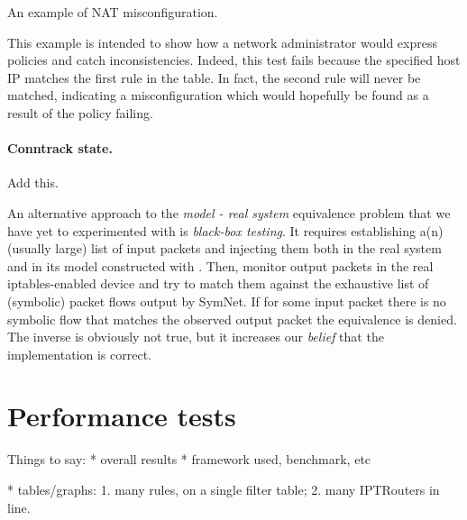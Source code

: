 \begin{listing}[H]
  \caption{An example of NAT misconfiguration.}
  \label{lst:unreachable-rule}
\end{listing}

This example is intended to show how a network administrator would express
policies and catch inconsistencies.  Indeed, this test fails because the
specified host IP matches the first rule in the table.  In fact, the second
rule will never be matched, indicating a misconfiguration which would hopefully
be found as a result of the policy failing.

\paragraph{Conntrack state.}
Add this.

\bigskip

An alternative approach to the \emph{model - real system} equivalence problem
that we have yet to experimented with is \emph{black-box testing}.  It requires
establishing a(n) (usually large) list of input packets and injecting them both
in the real system and in its model constructed with \TOOL.  Then, monitor
output packets in the real iptables-enabled device and try to match them
against the exhaustive list of (symbolic) packet flows output by SymNet.  If
for some input packet there is no symbolic flow that matches the observed
output packet the equivalence is denied.  The inverse is obviously not true,
but it increases our \emph{belief} that the implementation is correct.

\section{Performance tests}

Things to say:
* overall results
* framework used, benchmark, etc

* tables/graphs: 1. many rules, on a single filter table; 2. many IPTRouters in
line.
